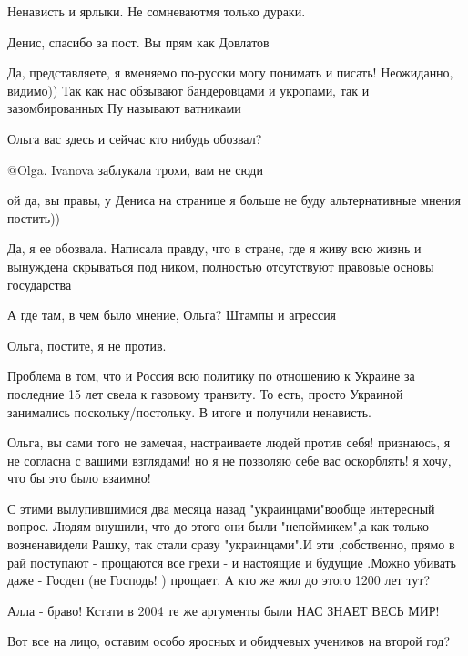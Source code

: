 \begin{itemize}
Ненависть и ярлыки. Не сомневаютмя только дураки.

Денис, спасибо за пост. Вы прям как Довлатов


Да, представляете, я вменяемо по-русски могу понимать и писать! Неожиданно,
видимо)) Так как нас обзывают бандеровцами и укропами, так и зазомбированных Пу
называют ватниками

Ольга вас здесь и сейчас кто нибудь обозвал?

@Olga. Ivanova заблукала трохи, вам не сюди

ой да, вы правы, у Дениса на странице я больше не буду альтернативные мнения постить))


Да, я ее обозвала. Написала правду, что в стране, где я живу всю жизнь и
вынуждена скрываться под ником, полностью отсутствуют правовые основы
государства

А где там, в чем было мнение, Ольга? Штампы и агрессия

Ольга, постите, я не против.


Проблема в том, что и Россия всю политику по отношению к Украине за последние 15
лет свела к газовому транзиту. То есть, просто Украиной занимались
поскольку/постольку. В итоге и получили ненависть.



Ольга, вы сами того не замечая, настраиваете людей против себя! признаюсь, я не
согласна с вашими взглядами! но я не позволяю себе вас оскорблять! я хочу, что
бы это было взаимно!


С этими вылупившимися два месяца назад "украинцами"вообще интересный
вопрос. Людям внушили, что до этого они были "непоймикем",а как только
возненавидели Рашку, так стали сразу "украинцами".И эти ,собственно, прямо в рай
поступают - прощаются все грехи - и настоящие и будущие .Можно убивать даже -
Госдеп (не Господь! ) прощает. А кто же жил до этого 1200 лет тут?

Алла - браво! Кстати в 2004 те же аргументы были НАС ЗНАЕТ ВЕСЬ МИР!

Вот все на лицо, оставим особо яросных и обидчевых учеников на второй год?


\end{itemize}
